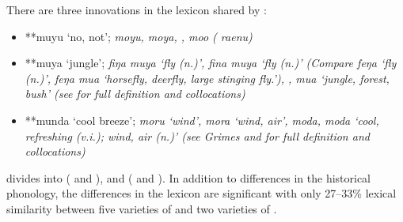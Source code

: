 There are three innovations in the lexicon shared by :

\begin{itemize}[noitemsep]
	\item	**muyu ‘no,
				not’;  \it{moyu,}  \it{moya},
				,  \it{moo} ( \it{raenu})
	\item	**muya ‘jungle’;  \it{fiŋa muya} ‘fly (n.)’,
				 \it{fina muya} ‘fly (n.)’ (Compare  \it{feŋa} ‘fly
				(n.)’, \it{feŋa mua} ‘horsefly, deerfly,
				large stinging fly.’), ,
				 \it{mua} ‘jungle, forest,
				bush’ (see \citet[633f]{GrimesGrimes2020} for full definition
				and collocations) 
	\item	**munda ‘cool breeze’;  \it{moru} ‘wind’,
				 \it{mora} ‘wind, air’,
				 \it{moda,}  \it{moda} ‘cool,
				refreshing (v.i.); wind, air (n.)’ (see Grimes
				and \citet[625f]{GrimesGrimes2020} for full definition
				and collocations) 
\end{itemize}

 divides into  (
and ), and  ( and ).
In addition to differences in the historical phonology,
the differences in the lexicon are significant with only 27--33{\%}
lexical similarity between five varieties of 
and two varieties of  \citep{Grimes2000a}.
